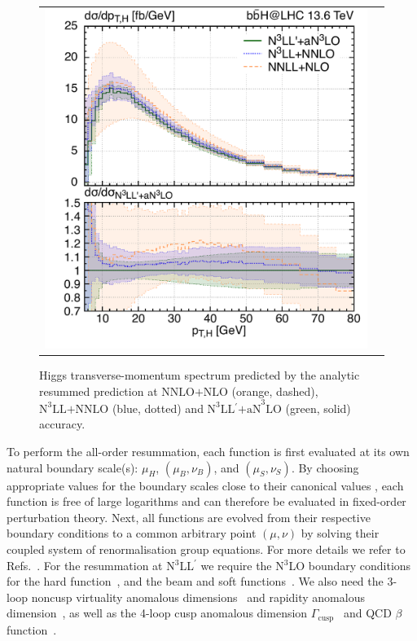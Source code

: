 \documentclass[11pt,a4paper]{article}
\begin{document}
\begin{figure}[t!]
	\begin{center}
		\begin{tabular}{cc}
			\includegraphics[width=.55\textwidth, page=1]{plots/5fs/resummation/ptzoom_Higgs__resum.pdf}
		\end{tabular}
		\vspace*{1ex}
		\caption{Higgs transverse-momentum spectrum predicted by the analytic resummed prediction at $\text{NNLO+NLO}$ (orange, dashed), $\text{N}^3\text{LL+NNLO}$ (blue, dotted) and $\text{N}^3\text{LL$^{\prime}$+aN}^3\text{LO}$ (green, solid) accuracy.\label{fig:resumplot}}
	\end{center}
\end{figure}
To perform the all-order resummation, each function is first evaluated at its own
natural boundary scale(s): $\mu_H$, $(\mu_B, \nu_B)$, and $(\mu_S, \nu_S)$. By
choosing appropriate values for the boundary scales close to their canonical
values , each function is free of large logarithms and can
therefore be evaluated in fixed-order perturbation theory. Next, all functions
are evolved from their respective boundary conditions to a common arbitrary point
$(\mu, \nu)$ by solving their coupled system of renormalisation group equations. For more details we refer to Refs.~\cite{Ebert:2016gcn,Ebert:2020dfc,Cal:2023mib}.
For the resummation at N$^3$LL$^{\prime}$ we require the N$^3$LO
boundary conditions for the hard function~\cite{Gehrmann:2014vha,
	Ebert:2017uel}, and the beam and soft functions~\cite{Lubbert:2016rku,
	Li:2016ctv, Billis:2019vxg, Luo:2019szz, Ebert:2020yqt}. We also need the 3-loop
noncusp virtuality anomalous dimensions~\cite{Lubbert:2016rku, Moch:2005id, Stewart:2010qs,
	Bruser:2018rad, Billis:2019vxg} and rapidity anomalous
dimension~\cite{Lubbert:2016rku, Li:2016ctv, Vladimirov:2016dll}, as well as
the 4-loop cusp anomalous dimension
$\Gamma_\mathrm{cusp}$~\cite{Korchemsky:1987wg, moch:2004pa, Bruser:2019auj,
	Henn:2019swt, vonManteuffel:2020vjv} and QCD $\beta$
function~\cite{Tarasov:1980au, Larin:1993tp, vanRitbergen:1997va,
	Czakon:2004bu}.
\end{document}
